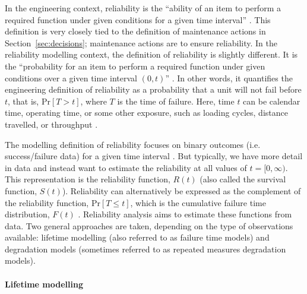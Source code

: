 In the engineering context, reliability is the ``ability of an item to perform a required function under given conditions for a given time interval'' \citep{ISO_14224_2016}. This definition is very closely tied to the definition of maintenance actions in Section~\ref{sec:decisions}; maintenance actions are to ensure reliability. In the reliability modelling context, the definition of reliability is slightly different. It is the ``probability for an item to perform a required function under given conditions over a given time interval $(0, t)$'' \citep{ISO_12489_2013}. In other words, it quantifies the engineering definition of reliability as a probability that a unit will not fail before $t$, that is, $\text{Pr}\left[T > t\right]$, where $T$ is the time of failure. Here, time $t$ can be calendar time, operating time, or some other exposure, such as loading cycles, distance travelled, or throughput \citep{lee2006}.

The modelling definition of reliability focuses on binary outcomes (i.e. success/failure data) for a given time interval \citep{hamada_2008}. But typically, we have more detail in data and instead want to estimate the reliability at all values of $t = [0, \infty)$. This representation is the reliability function, $R(t)$ (also called the survival function, $S(t)$). Reliability can alternatively be expressed as the complement of the reliability function, $\text{Pr}\left[T \le t\right]$, which is the cumulative failure time distribution, $F(t)$ \citep{Meeker2022}. Reliability analysis aims to estimate these functions from data. Two general approaches are taken, depending on the type of observations available: lifetime modelling (also referred to as failure time models) and degradation models (sometimes referred to as repeated measures degradation models).

\paragraph*{Lifetime modelling} 

